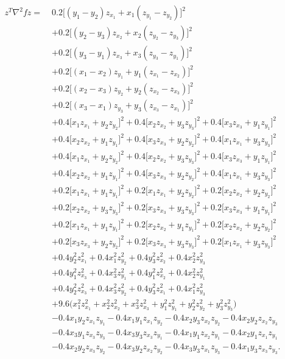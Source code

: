 \documentclass[12pt]{elsarticle}
\theoremstyle{definition}
\begin{document}
\begin{align*}
z^T \nabla^2 f z =\;
& 0.2\Big[(y_1 - y_2)z_{x_1} + x_1(z_{y_1} - z_{y_2})\Big]^2 \\
&+ 0.2\Big[(y_2 - y_3)z_{x_2} + x_2(z_{y_2} - z_{y_3})\Big]^2 \\
&+ 0.2\Big[(y_3 - y_1)z_{x_3} + x_3(z_{y_3} - z_{y_1})\Big]^2 \\
&+ 0.2\Big[(x_1 - x_2)z_{y_1} + y_1(z_{x_1} - z_{x_2})\Big]^2 \\
&+ 0.2\Big[(x_2 - x_3)z_{y_2} + y_2(z_{x_2} - z_{x_3})\Big]^2 \\
&+ 0.2\Big[(x_3 - x_1)z_{y_3} + y_3(z_{x_3} - z_{x_1})\Big]^2 \\
&+ 0.4\Big[x_1z_{x_1} + y_2z_{y_2}\Big]^2
+ 0.4\Big[x_2z_{x_2} + y_3z_{y_3}\Big]^2
+ 0.4\Big[x_3z_{x_3} + y_1z_{y_1}\Big]^2 \\
&+ 0.4\Big[x_2z_{x_2} + y_1z_{y_1}\Big]^2
+ 0.4\Big[x_3z_{x_3} + y_2z_{y_2}\Big]^2
+ 0.4\Big[x_1z_{x_1} + y_3z_{y_3}\Big]^2 \\
&+ 0.4\Big[x_1z_{x_1} + y_2z_{y_2}\Big]^2
+ 0.4\Big[x_2z_{x_2} + y_3z_{y_3}\Big]^2
+ 0.4\Big[x_3z_{x_3} + y_1z_{y_1}\Big]^2 \\
&+ 0.4\Big[x_2z_{x_2} + y_1z_{y_1}\Big]^2
+ 0.4\Big[x_3z_{x_3} + y_2z_{y_2}\Big]^2
+ 0.4\Big[x_1z_{x_1} + y_3z_{y_3}\Big]^2 \\
&+ 0.2\Big[x_1z_{x_1} + y_1z_{y_1}\Big]^2
+ 0.2\Big[x_1z_{x_1} + y_2z_{y_2}\Big]^2
+ 0.2\Big[x_2z_{x_2} + y_2z_{y_2}\Big]^2 \\
&+ 0.2\Big[x_2z_{x_2} + y_3z_{y_3}\Big]^2
+ 0.2\Big[x_3z_{x_3} + y_3z_{y_3}\Big]^2
+ 0.2\Big[x_3z_{x_3} + y_1z_{y_1}\Big]^2 \\
&+ 0.2\Big[x_1z_{x_1} + y_1z_{y_1}\Big]^2
+ 0.2\Big[x_2z_{x_2} + y_1z_{y_1}\Big]^2
+ 0.2\Big[x_2z_{x_2} + y_2z_{y_2}\Big]^2 \\
&+ 0.2\Big[x_3z_{x_3} + y_2z_{y_2}\Big]^2
+ 0.2\Big[x_3z_{x_3} + y_3z_{y_3}\Big]^2
+ 0.2\Big[x_1z_{x_1} + y_3z_{y_3}\Big]^2 \\
&+ 0.4y_2^2z_{x_1}^2 + 0.4x_1^2z_{y_2}^2
+ 0.4y_3^2z_{x_2}^2 + 0.4x_2^2z_{y_3}^2 \\
&+ 0.4y_1^2z_{x_3}^2 + 0.4x_3^2z_{y_1}^2
+ 0.4y_1^2z_{x_2}^2 + 0.4x_2^2z_{y_1}^2 \\
&+ 0.4y_2^2z_{x_3}^2 + 0.4x_3^2z_{y_2}^2
+ 0.4y_3^2z_{x_1}^2 + 0.4x_1^2z_{y_3}^2 \\
&+ 9.6\Big(x_1^2z_{x_1}^2 + x_2^2z_{x_2}^2 + x_3^2z_{x_3}^2
+ y_1^2z_{y_1}^2 + y_2^2z_{y_2}^2 + y_3^2z_{y_3}^2\Big) \\
&- 0.4x_1y_2z_{x_1}z_{y_1}
- 0.4x_1y_1z_{x_1}z_{y_2}
- 0.4x_2y_3z_{x_2}z_{y_2}
- 0.4x_2y_2z_{x_2}z_{y_3} \\
&- 0.4x_3y_1z_{x_3}z_{y_3}
- 0.4x_3y_3z_{x_3}z_{y_1}
- 0.4x_1y_1z_{x_2}z_{y_1}
- 0.4x_2y_1z_{x_1}z_{y_1} \\
&- 0.4x_2y_2z_{x_3}z_{y_2}
- 0.4x_3y_2z_{x_2}z_{y_2}
- 0.4x_3y_3z_{x_1}z_{y_3}
- 0.4x_1y_3z_{x_3}z_{y_3}.
\end{align*}
\end{document}
